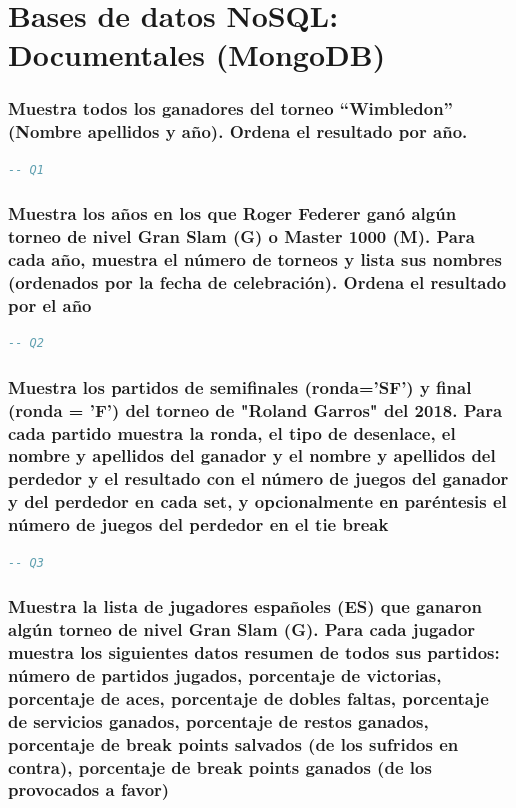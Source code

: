 \documentclass[10pt]{opticajnl}
\begin{document}
\section{Bases de datos NoSQL: Documentales (MongoDB)}

\subsubsection{Muestra todos los ganadores del torneo ``Wimbledon'' (Nombre apellidos y año). Ordena el resultado por año.}

\begin{lstlisting}[language=SQL]
-- Q1
\end{lstlisting}





\subsubsection{Muestra los años en los que Roger Federer ganó algún torneo de nivel Gran Slam (G) o Master 1000 (M). Para cada año, muestra el número de torneos y lista sus nombres (ordenados por la fecha de celebración). Ordena el resultado por el año}

\begin{lstlisting}[language=SQL]
-- Q2
\end{lstlisting}





\subsubsection{Muestra los partidos de semiﬁnales (ronda='SF') y ﬁnal (ronda = 'F') del torneo de "Roland Garros" del 2018. Para cada partido muestra la ronda, el tipo de desenlace, el nombre y apellidos del ganador y el nombre y apellidos del perdedor y el resultado con el número de juegos del ganador y del perdedor en cada set, y opcionalmente en paréntesis el número de juegos del perdedor en el tie break}

\begin{lstlisting}[language=SQL]
-- Q3
\end{lstlisting}





\subsubsection{Muestra la lista de jugadores españoles (ES) que ganaron algún torneo de nivel Gran Slam (G). Para cada jugador muestra los siguientes datos resumen de todos sus partidos: número de partidos jugados, porcentaje de victorias, porcentaje de aces, porcentaje de dobles faltas, porcentaje de servicios ganados, porcentaje de restos ganados, porcentaje de break points salvados (de los sufridos en contra), porcentaje de break points ganados (de los provocados a favor)}
\end{document}
